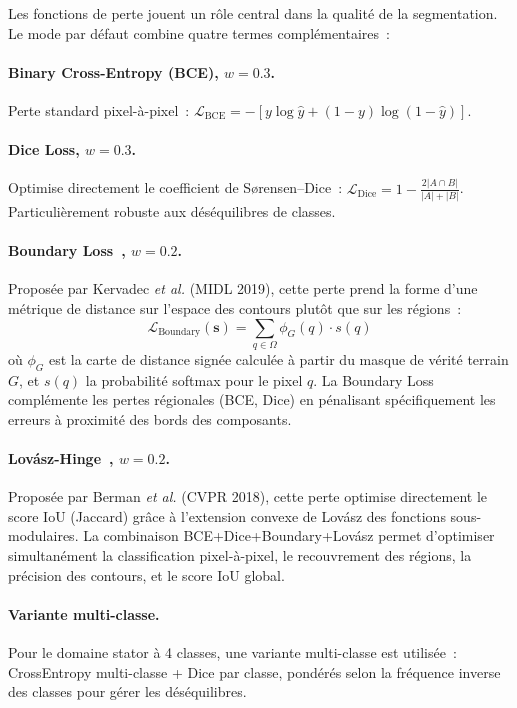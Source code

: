 \documentclass[12pt,a4paper]{report}
\begin{document}
Les fonctions de perte jouent un r\^ole central dans la qualit\'e de la segmentation. Le mode par d\'efaut combine quatre termes compl\'ementaires~:

\paragraph{Binary Cross-Entropy (BCE), $w=0.3$.}
Perte standard pixel-\`a-pixel~: $\mathcal{L}_\text{BCE} = -[y \log \hat{y} + (1-y)\log(1-\hat{y})]$.

\paragraph{Dice Loss, $w=0.3$.}
Optimise directement le coefficient de S{\o}rensen--Dice~: $\mathcal{L}_\text{Dice} = 1 - \frac{2|A \cap B|}{|A| + |B|}$. Particuli\`erement robuste aux d\'es\'equilibres de classes.

\paragraph{Boundary Loss~\cite{kervadec2019boundary}, $w=0.2$.}
Propos\'ee par Kervadec \textit{et al.} (MIDL 2019), cette perte prend la forme d'une m\'etrique de distance sur l'espace des contours plut\^ot que sur les r\'egions~:
\[
    \mathcal{L}_\text{Boundary}(\mathbf{s}) = \sum_{q \in \Omega} \phi_G(q) \cdot s(q)
\]
o\`u $\phi_G$ est la carte de distance sign\'ee calcul\'ee \`a partir du masque de v\'erit\'e terrain $G$, et $s(q)$ la probabilit\'e softmax pour le pixel $q$. La Boundary Loss compl\'emente les pertes r\'egionales (BCE, Dice) en p\'enalisant sp\'ecifiquement les erreurs \`a proximit\'e des bords des composants.

\paragraph{Lov\'asz-Hinge~\cite{berman2018lovasz}, $w=0.2$.}
Propos\'ee par Berman \textit{et al.} (CVPR 2018), cette perte optimise directement le score IoU (Jaccard) gr\^ace \`a l'extension convexe de Lov\'asz des fonctions sous-modulaires. La combinaison BCE+Dice+Boundary+Lov\'asz permet d'optimiser simultan\'ement la classification pixel-\`a-pixel, le recouvrement des r\'egions, la pr\'ecision des contours, et le score IoU global.

\paragraph{Variante multi-classe.}
Pour le domaine stator \`a 4 classes, une variante multi-classe est utilis\'ee~: CrossEntropy multi-classe + Dice par classe, pond\'er\'es selon la fr\'equence inverse des classes pour g\'erer les d\'es\'equilibres.
\end{document}

